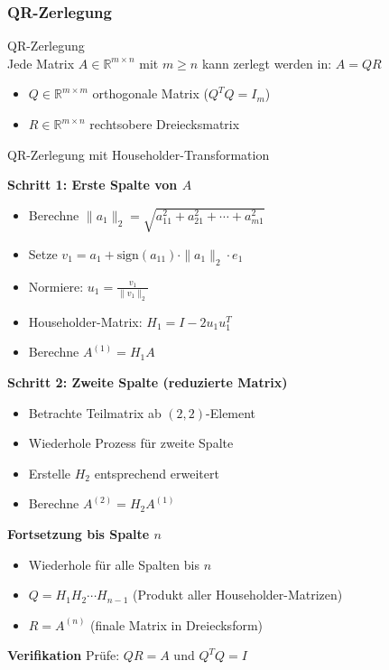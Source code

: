 \raggedcolumns
\columnbreak

\subsubsection{QR-Zerlegung}


\begin{definition}{QR-Zerlegung}\\
Jede Matrix $A \in \mathbb{R}^{m \times n}$ mit $m \geq n$ kann zerlegt werden in:
$A = QR$
\begin{itemize}
    \item $Q \in \mathbb{R}^{m \times m}$ orthogonale Matrix ($Q^T Q = I_m$)
    \item $R \in \mathbb{R}^{m \times n}$ rechtsobere Dreiecksmatrix
\end{itemize}
\end{definition}

\begin{KR}{QR-Zerlegung mit Householder-Transformation}

\textbf{Schritt 1: Erste Spalte von $A$}
\begin{itemize}
    \item Berechne $\|a_1\|_2 = \sqrt{a_{11}^2 + a_{21}^2 + \cdots + a_{m1}^2}$
    \item Setze $v_1 = a_1 + \text{sign}(a_{11}) \cdot \|a_1\|_2 \cdot e_1$
    \item Normiere: $u_1 = \frac{v_1}{\|v_1\|_2}$
    \item Householder-Matrix: $H_1 = I - 2u_1 u_1^T$
    \item Berechne $A^{(1)} = H_1 A$
\end{itemize}

\textbf{Schritt 2: Zweite Spalte (reduzierte Matrix)}
\begin{itemize}
    \item Betrachte Teilmatrix ab $(2,2)$-Element
    \item Wiederhole Prozess für zweite Spalte
    \item Erstelle $H_2$ entsprechend erweitert
    \item Berechne $A^{(2)} = H_2 A^{(1)}$
\end{itemize}

\textbf{Fortsetzung bis Spalte $n$}
\begin{itemize}
    \item Wiederhole für alle Spalten bis $n$
    \item $Q = H_1 H_2 \cdots H_{n-1}$ (Produkt aller Householder-Matrizen)
    \item $R = A^{(n)}$ (finale Matrix in Dreiecksform)
\end{itemize}

\textbf{Verifikation}
Prüfe: $QR = A$ und $Q^T Q = I$
\end{KR}

